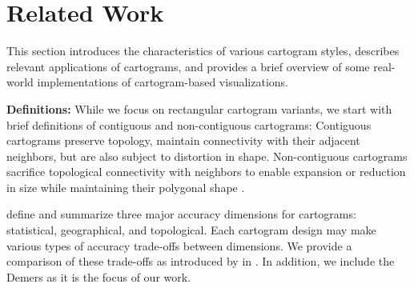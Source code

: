 \documentclass[Afour,sagev,times]{sagej}
\newcommand{\bobgraph}[1]{\noindent\textbf{#1}}
\begin{document}
\section{Related Work}
\label{sec:RelatedWork}

This section introduces the characteristics of various cartogram styles, describes relevant applications of cartograms, and provides a brief overview of some real-world implementations of cartogram-based visualizations.

\bobgraph{Definitions: }While we focus on rectangular cartogram variants, we start with brief definitions of contiguous and non-contiguous cartograms: Contiguous cartograms preserve topology, maintain connectivity with their adjacent neighbors, but are also subject to distortion in shape. Non-contiguous cartograms sacrifice topological connectivity with neighbors to enable expansion or reduction in size while maintaining their polygonal shape \cite{dent2009Cartography}.

\citet{nusrat2016State} define and summarize three major accuracy dimensions for cartograms: statistical, geographical, and topological. Each cartogram design may make various types of accuracy trade-offs between dimensions. We provide a comparison of these trade-offs as introduced by \citet{nusrat2016State} in . In addition, we include the Demers as it is the focus of our work.
\end{document}

